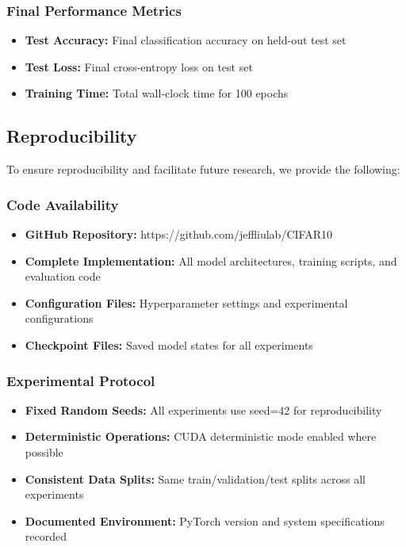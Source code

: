 \documentclass[12pt]{article}
\begin{document}
\subsubsection{Final Performance Metrics}
\begin{itemize}
    \item \textbf{Test Accuracy:} Final classification accuracy on held-out test set
    \item \textbf{Test Loss:} Final cross-entropy loss on test set
    \item \textbf{Training Time:} Total wall-clock time for 100 epochs
\end{itemize}

\subsection{Reproducibility}

To ensure reproducibility and facilitate future research, we provide the following:

\subsubsection{Code Availability}
\begin{itemize}
    \item \textbf{GitHub Repository:} https://github.com/jeffliulab/CIFAR10
    \item \textbf{Complete Implementation:} All model architectures, training scripts, and evaluation code
    \item \textbf{Configuration Files:} Hyperparameter settings and experimental configurations
    \item \textbf{Checkpoint Files:} Saved model states for all experiments
\end{itemize}

\subsubsection{Experimental Protocol}
\begin{itemize}
    \item \textbf{Fixed Random Seeds:} All experiments use seed=42 for reproducibility
    \item \textbf{Deterministic Operations:} CUDA deterministic mode enabled where possible
    \item \textbf{Consistent Data Splits:} Same train/validation/test splits across all experiments
    \item \textbf{Documented Environment:} PyTorch version and system specifications recorded
\end{itemize}
\end{document}
